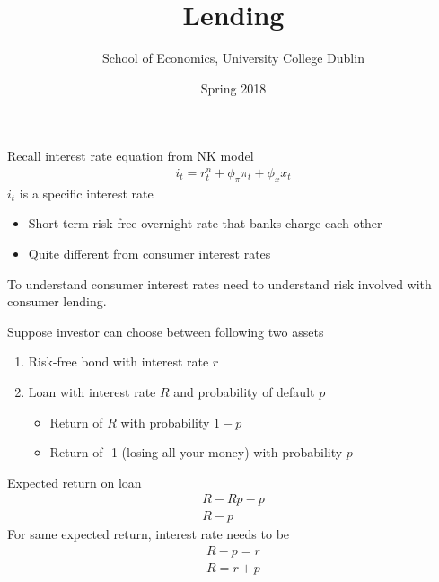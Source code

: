 \documentclass{beamer}
\title{Lending}
\author{School of Economics, University College Dublin}
\date{Spring 2018}
\begin{document}
\begin{frame}
 \titlepage
\end{frame}

\begin{frame}
 Recall interest rate equation from NK model
  \begin{align} 
  i_t=r_t^n+ \phi_{\pi}\pi_t+\phi_xx_t 
\end{align}
\medskip
$i_t$ is a specific interest rate
\begin{itemize}
  \item Short-term risk-free overnight rate that banks charge each other
  \item Quite different from consumer interest rates
\end{itemize}
\medskip
To understand consumer interest rates need to understand risk involved with consumer lending. 
\end{frame}

\begin{frame}
 Suppose investor can choose between following two assets  
\begin{enumerate}
  \item Risk-free bond with interest rate $r$
  \item Loan with interest rate $R$ and probability of default $p$
  \begin{itemize}
    \item Return of $R$ with probability $1-p$
    \item Return of -1 (losing all your money) with probability $p$
  \end{itemize}
\end{enumerate}
\end{frame}

\begin{frame}
  Expected return on loan
  \begin{align}
    R-Rp-p\\ \nonumber
    R-p
\end{align}
 For same expected return, interest rate needs to be
\begin{align}
  R-p=r\\ \nonumber
  R=r+p
\end{align}
\end{frame}
\end{document}
